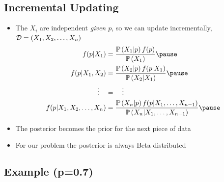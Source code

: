 \begin{slide}
\section[-2]{Incremental Updating}

\begin{PauseHighLight}
  \begin{itemize}
  \item The $X_i$ are independent \emph{given $p$}, so we can update
    incrementally, $\mathcal{D} = (X_1, X_2, \ldots, X_n)$
    \begin{align*}
      f(p|X_1) &= \frac{\Prob{X_1|p} f(p)}{\Prob{X_1}} \pause
      \\
      f(p|X_1,X_2) &= \frac{\Prob{X_2|p} f(p|X_1)}{\Prob{X_2|X_1}} \pause
      \\ 
      \vdots \quad &= \quad \vdots
      \\
      f(p|X_1,X_2,\ldots, X_n) &= \frac{\Prob{X_n|p} 
        f(p|X_1,\ldots,X_{n-1})}{\Prob{X_n|X_1,\ldots,X_{n-1}}}\pause
    \end{align*} 
  \item The posterior becomes the prior for the next piece of data\pause
  \item For our problem the posterior is always Beta distributed\pause
  \end{itemize}
\end{PauseHighLight}

\end{slide}


\begin{slide}
\section[-1]{Example (p=0.7)}
\pb
\pause{}
\begin{center}
  \pause
\end{center}
\end{slide}


